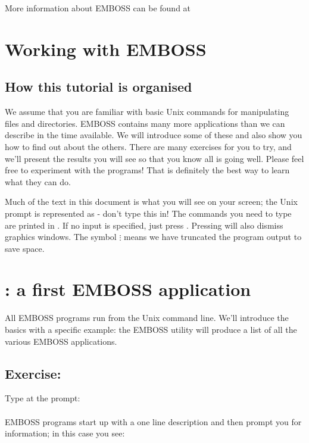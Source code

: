 \documentclass[12pt]{report}
\begin{document}
More information about EMBOSS can be found at\\

\section{Working with EMBOSS}

\subsection{How	this tutorial is organised}

We assume that you are familiar	with basic Unix	commands for
manipulating files and directories. EMBOSS contains many more
applications than we can describe in the time available. We will
introduce some of these	and also show you how to find out about	the
others.	There are many exercises for you to try, and we'll present the
results	you will see so	that you know all is going well. Please	feel
free to	experiment with	the programs!  That is definitely the best way
to learn what they can do.

Much of	the text in this document is what you will see on your screen;
the Unix prompt	is represented as \unix{} - don't type this in!	The
commands you need to type are printed in . If no input is
specified, just	press . Pressing  will also
dismiss	graphics windows. The symbol $\vdots$ means we have
truncated the program output to	save space.

\section{: a first EMBOSS application}
All EMBOSS programs run	from the Unix command line. We'll introduce
the basics with	a specific example: the	EMBOSS utility
 will produce a	list of	all the	various	EMBOSS
applications.

\subsection*{Exercise: }

Type  at	the \unix{}prompt:\\

\unix{}\\

EMBOSS programs	start up with a	one line description and then prompt you for information; in this case you see:\\
\end{document}
